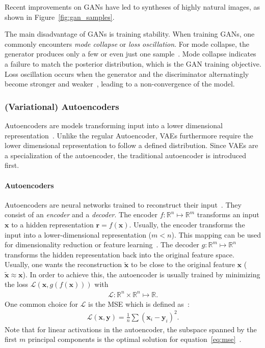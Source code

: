 Recent improvements on \acp{GAN} have led to syntheses of highly natural images, as shown in Figure~\ref{fig:gan_samples}.

The main disadvantage of \acp{GAN} is training stability.
When training \acp{GAN}, one commonly encounters \textit{mode collapse} or \textit{loss oscillation}.
For mode collapse, the generator produces only a few or even just one sample~\citep{che2016mode}.
Mode collapse indicates a failure to match the posterior distribution, which is the \ac{GAN} training objective.
Loss oscillation occurs when the generator and the discriminator alternatingly become stronger and weaker~\citep{ham2020unbalanced}, leading to a non-convergence of the model.

\subsubsection{(Variational) Autoencoders}\label{subsec:variational-autoencoders}

Autoencoders are models transforming input into a lower dimensional representation~\citep[p. 146]{Goodfellow-et-al-2016}.
Unlike the regular Autoencoder, \acp{VAE} furthermore require the lower dimensional representation to follow a defined distribution.
Since \acfp{VAE} are a specialization of the autoencoder, the traditional autoencoder is introduced first.

\paragraph{Autoencoders}

Autoencoders are neural networks trained to reconstruct their input~\citep[p. 499]{Goodfellow-et-al-2016}.
They consist of an \textit{encoder} and a \textit{decoder}.
The encoder $f: \mathbb{R}^n \mapsto \mathbb{R}^m$ transforms an input $\bm{x}$ to a hidden representation $\bm{r} = f(\bm{x})$.
Usually, the encoder transforms the input into a lower-dimensional representation ($m < n$).
This mapping can be used for dimensionality reduction or feature learning~\citep[p. 499]{Goodfellow-et-al-2016}.
The decoder $g: \mathbb{R}^m \mapsto \mathbb{R}^n$ transforms the hidden representation back into the original feature space.
Usually, one wants the reconstruction $\tilde{\bm{x}}$ to be close to the original feature $\bm{x}$ ($\tilde{\bm{x}} \approx \bm{x}$).
In order to achieve this, the autoencoder is usually trained by minimizing the loss $\mathcal{L}(\bm{x}, g(f(\bm{x})))$ with
\begin{align}
    \mathcal{L}: \mathbb{R}^n \times \mathbb{R}^n \mapsto \mathbb{R}.
\end{align}
One common choice for $\mathcal{L}$ is the \ac{MSE} which is defined as~\citep[p. 106]{Goodfellow-et-al-2016}:
\begin{align}
    \mathcal{L}(\bm{x}, \bm{y}) = \frac{1}{n}\sum (\bm{x}_i - \bm{y}_i)^2. \label{eq:mse}
\end{align}
Note that for linear activations in the autoencoder, the subspace spanned by the first $m$ principal components is the optimal solution for equation~\ref{eq:mse}~\citep{chicco2014deep}.

